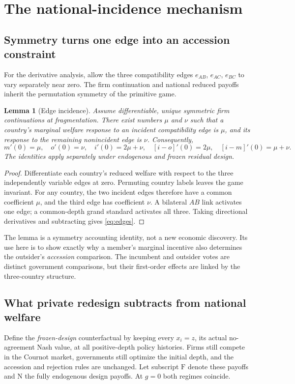 \documentclass[11pt,a4paper]{article}
\newtheorem{lemma}[theorem]{Lemma}
\theoremstyle{remark}\newtheorem{remark}[theorem]{Remark}
\newcommand{\N}{\mathrm{N}}\newcommand{\F}{\mathrm{F}}
\begin{document}
\section{The national-incidence mechanism}\label{sec:mechanism}
\subsection{Symmetry turns one edge into an accession constraint}
For the derivative analysis, allow the three compatibility edges $e_{AB}$, $e_{AC}$, $e_{BC}$ to vary separately near zero. The firm continuation and national reduced payoffs inherit the permutation symmetry of the primitive game.
\begin{lemma}[Edge incidence]\label{lem:edges}
Assume differentiable, unique symmetric firm continuations at fragmentation. There exist numbers $\mu$ and $\nu$ such that a country's marginal welfare response to an incident compatibility edge is $\mu$, and its response to the remaining nonincident edge is $\nu$. Consequently,
\begin{equation}\label{eq:edges}
m'(0)=\mu,\quad o'(0)=\nu,\quad i'(0)=2\mu+\nu,\quad
[i-o]'(0)=2\mu,\quad [i-m]'(0)=\mu+\nu.
\end{equation}
The identities apply separately under endogenous and frozen residual design.
\end{lemma}
\begin{proof}
Differentiate each country's reduced welfare with respect to the three independently variable edges at zero. Permuting country labels leaves the game invariant. For any country, the two incident edges therefore have a common coefficient $\mu$, and the third edge has coefficient $\nu$. A bilateral $AB$ link activates one edge; a common-depth grand standard activates all three. Taking directional derivatives and subtracting gives \eqref{eq:edges}.
\end{proof}

The lemma is a symmetry accounting identity, not a new economic discovery. Its use here is to show exactly why a member's marginal incentive also determines the outsider's \emph{accession} comparison. The incumbent and outsider votes are distinct government comparisons, but their first-order effects are linked by the three-country structure.

\subsection{What private redesign subtracts from national welfare}
Define the \emph{frozen-design} counterfactual by keeping every $x_i=z$, its actual no-agreement Nash value, at all positive-depth policy histories. Firms still compete in the Cournot market, governments still optimize the initial depth, and the accession and rejection rules are unchanged. Let subscript $\F$ denote these payoffs and $\N$ the fully endogenous design payoffs. At $g=0$ both regimes coincide.
\end{document}
